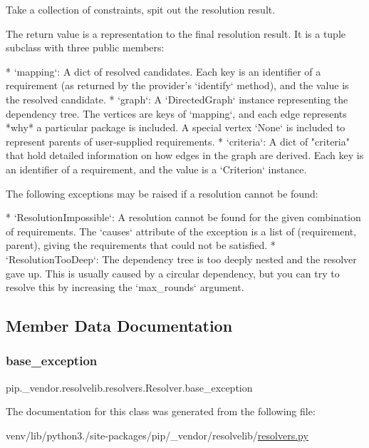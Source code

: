 \begin{DoxyVerb}Take a collection of constraints, spit out the resolution result.

The return value is a representation to the final resolution result. It
is a tuple subclass with three public members:

* `mapping`: A dict of resolved candidates. Each key is an identifier
    of a requirement (as returned by the provider's `identify` method),
    and the value is the resolved candidate.
* `graph`: A `DirectedGraph` instance representing the dependency tree.
    The vertices are keys of `mapping`, and each edge represents *why*
    a particular package is included. A special vertex `None` is
    included to represent parents of user-supplied requirements.
* `criteria`: A dict of "criteria" that hold detailed information on
    how edges in the graph are derived. Each key is an identifier of a
    requirement, and the value is a `Criterion` instance.

The following exceptions may be raised if a resolution cannot be found:

* `ResolutionImpossible`: A resolution cannot be found for the given
    combination of requirements. The `causes` attribute of the
    exception is a list of (requirement, parent), giving the
    requirements that could not be satisfied.
* `ResolutionTooDeep`: The dependency tree is too deeply nested and
    the resolver gave up. This is usually caused by a circular
    dependency, but you can try to resolve this by increasing the
    `max_rounds` argument.
\end{DoxyVerb}
 

\subsection{Member Data Documentation}
\mbox{\label{classpip_1_1__vendor_1_1resolvelib_1_1resolvers_1_1Resolver_a608c37b1bb3d51c83b5d253b54aaa071}} 
\subsubsection{\texorpdfstring{base\+\_\+exception}{base\_exception}}
{\footnotesize\ttfamily pip.\+\_\+vendor.\+resolvelib.\+resolvers.\+Resolver.\+base\+\_\+exception\hspace{0.3cm}{\ttfamily [static]}}



The documentation for this class was generated from the following file\+:\begin{DoxyCompactItemize}
\item 
venv/lib/python3./site-\/packages/pip/\+\_\+vendor/resolvelib/\hyperlink{resolvers_8py}{resolvers.\+py}\end{DoxyCompactItemize}
